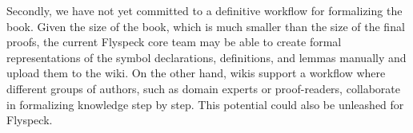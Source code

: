 Secondly, we have not yet committed to a definitive workflow for formalizing the book.
Given the size of the book, which is much smaller than the size of the final
proofs, the current Flyspeck core team may be able to create formal
representations of the symbol declarations, definitions, and lemmas manually and upload
them to the wiki.  On the other hand, wikis support a workflow where different groups of
authors, such as domain experts or proof-readers, collaborate in formalizing knowledge
step by step.  This potential could also be unleashed for Flyspeck.

